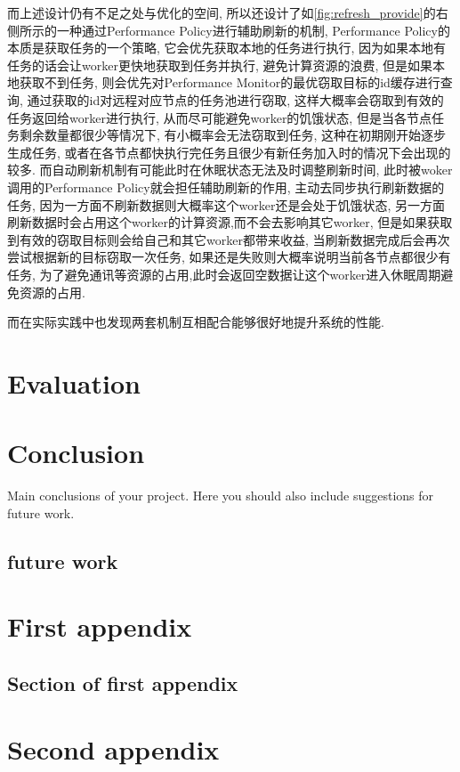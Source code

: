 \documentclass{mproj}
\begin{document}
而上述设计仍有不足之处与优化的空间,
所以还设计了如\cref{fig:refresh_provide}的右侧所示的一种通过Performance Policy进行辅助刷新的机制,
Performance Policy的本质是获取任务的一个策略,
它会优先获取本地的任务进行执行,
因为如果本地有任务的话会让worker更快地获取到任务并执行,
避免计算资源的浪费,
但是如果本地获取不到任务,
则会优先对Performance Monitor的最优窃取目标的id缓存进行查询,
通过获取的id对远程对应节点的任务池进行窃取,
这样大概率会窃取到有效的任务返回给worker进行执行,
从而尽可能避免worker的饥饿状态,
但是当各节点任务剩余数量都很少等情况下,
有小概率会无法窃取到任务,
这种在初期刚开始逐步生成任务,
或者在各节点都快执行完任务且很少有新任务加入时的情况下会出现的较多.
而自动刷新机制有可能此时在休眠状态无法及时调整刷新时间,
此时被woker调用的Performance Policy就会担任辅助刷新的作用,
主动去同步执行刷新数据的任务,
因为一方面不刷新数据则大概率这个worker还是会处于饥饿状态,
另一方面刷新数据时会占用这个worker的计算资源,而不会去影响其它worker,
但是如果获取到有效的窃取目标则会给自己和其它worker都带来收益,
当刷新数据完成后会再次尝试根据新的目标窃取一次任务,
如果还是失败则大概率说明当前各节点都很少有任务,
为了避免通讯等资源的占用,此时会返回空数据让这个worker进入休眠周期避免资源的占用.

而在实际实践中也发现两套机制互相配合能够很好地提升系统的性能.

\chapter{Evaluation}


\chapter{Conclusion}\label{conclusion}

Main conclusions of your project. Here you should also include suggestions for future work.

\section{future work}


\appendix %
\chapter{First appendix}

\section{Section of first appendix}

\chapter{Second appendix}



\end{document}
